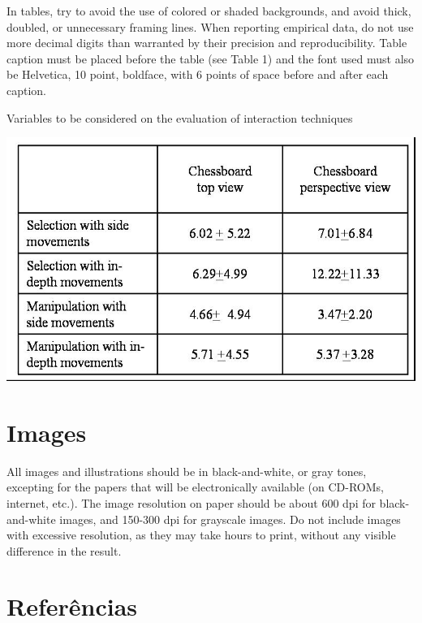 \documentclass[12pt]{article}
\begin{document}
In tables, try to avoid the use of colored or shaded backgrounds, and avoid
thick, doubled, or unnecessary framing lines. When reporting empirical data,
do not use more decimal digits than warranted by their precision and
reproducibility. Table caption must be placed before the table (see Table 1)
and the font used must also be Helvetica, 10 point, boldface, with 6 points of
space before and after each caption.

\begin{table}[ht]
\centering
\caption{Variables to be considered on the evaluation of interaction
  techniques}
\label{tab:exTable1}
\includegraphics[width=.7\textwidth]{table.jpg}
\end{table}

\section{Images}

All images and illustrations should be in black-and-white, or gray tones,
excepting for the papers that will be electronically available (on CD-ROMs,
internet, etc.). The image resolution on paper should be about 600 dpi for
black-and-white images, and 150-300 dpi for grayscale images.  Do not include
images with excessive resolution, as they may take hours to print, without any
visible difference in the result. 

\section{Referências}



\end{document}
